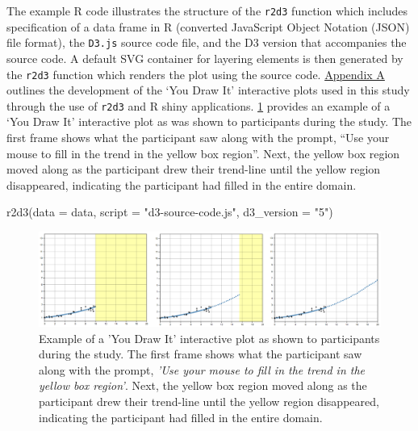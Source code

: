 \documentclass[print]{nuthesis}
\newenvironment{Shaded}{\begin{snugshade}}{\end{snugshade}}
\newcommand{\AttributeTok}[1]{\textcolor[rgb]{0.77,0.63,0.00}{#1}}
\newcommand{\FunctionTok}[1]{\textcolor[rgb]{0.00,0.00,0.00}{#1}}
\newcommand{\NormalTok}[1]{#1}
\newcommand{\StringTok}[1]{\textcolor[rgb]{0.31,0.60,0.02}{#1}}
\begin{document}
The example R code illustrates the structure of the \texttt{r2d3} function which includes specification of a data frame in R (converted JavaScript Object Notation (JSON) file format), the \texttt{D3.js} source code file, and the D3 version that accompanies the source code.
A default SVG container for layering elements is then generated by the \texttt{r2d3} function which renders the plot using the source code.
\protect\hyperlink{youdrawit-with-shiny}{Appendix A} outlines the development of the `You Draw It' interactive plots used in this study through the use of \texttt{r2d3} and R shiny applications.
\cref{fig:youdrawit-example} provides an example of a `You Draw It' interactive plot as was shown to participants during the study.
The first frame shows what the participant saw along with the prompt, ``Use your mouse to fill in the trend in the yellow box region''.
Next, the yellow box region moved along as the participant drew their trend-line until the yellow region disappeared, indicating the participant had filled in the entire domain.

\begin{Shaded}
\begin{Highlighting}[]
\FunctionTok{r2d3}\NormalTok{(}\AttributeTok{data =}\NormalTok{ data, }\AttributeTok{script =} \StringTok{"d3{-}source{-}code.js"}\NormalTok{,}
    \AttributeTok{d3\_version =} \StringTok{"5"}\NormalTok{)}
\end{Highlighting}
\end{Shaded}

\begin{figure}[tbp]

{\centering \includegraphics[width=1\linewidth,]{images/02-you-draw-it/ydiExample-0.10-10-linear} 

}

\caption['You Draw It' task plot example]{Example of a 'You Draw It' interactive plot as shown to participants during the study. The first frame shows what the participant saw along with the prompt, \textit{'Use your mouse to fill in the trend in the yellow box region'}. Next, the yellow box region moved along as the participant drew their trend-line until the yellow region disappeared, indicating the participant had filled in the entire domain.}\label{fig:youdrawit-example}
\end{figure}
\end{document}
